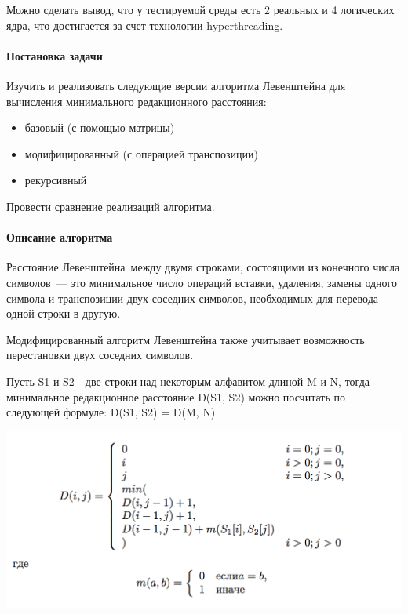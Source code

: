 \documentclass[utf8x, 12pt]{G7-32} %
\begin{document}
Можно сделать вывод, что у тестируемой среды есть 2 реальных и 4 логических ядра, что достигается за счет технологии hyperthreading.

\newpage

\paragraph{Постановка задачи}

Изучить и реализовать следующие версии алгоритма Левенштейна для вычисления минимального редакционного расстояния:
\begin{itemize}
	\item базовый (с помощью матрицы)
	\item модифицированный (с операцией транспозиции)
	\item рекурсивный
\end{itemize}
Провести сравнение реализаций алгоритма.

\paragraph{Описание алгоритма}

Расстояние Левенштейна между двумя строками, состоящими из конечного числа символов — это минимальное число операций вставки, удаления, замены одного символа и транспозиции двух соседних символов, необходимых для перевода одной строки в другую.

Модифицированный алгоритм Левенштейна также учитывает возможность перестановки двух соседних символов.

Пусть S1 и S2 - две строки над некоторым алфавитом длиной M и N, тогда минимальное редакционное расстояние D(S1, S2) можно посчитать по следующей формуле: D(S1, S2) = D(M, N)

\begin{center}
	\includegraphics{images/lev.png}
\end{center}
\end{document}
